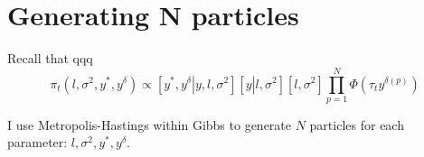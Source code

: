 \documentclass{sfuthesis}
\begin{document}
\section{Generating N particles}

Recall that qqq
\begin{equation}
  {\pi _t}\left( {l,{\sigma ^2},{y^*},{y^\delta }} \right) \propto \left[ {{y^*},{y^\delta }\left| {y,l,{\sigma ^2}} \right.} \right]\left[ {y\left| {l,{\sigma ^2}} \right.} \right]\left[ {l,{\sigma ^2}} \right]\prod\limits_{p = 1}^N {\Phi \left( {{\tau _t}{y^{\delta \left( p \right)}}} \right)} 
\end{equation}

I use Metropolis-Hastings within Gibbs to generate $N$ particles 
for each parameter: $l, \sigma^2, y^*, y^\delta$. 


\end{document}
